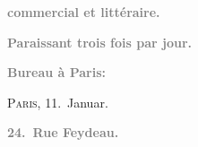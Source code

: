 \pstart
           \begin{otherlanguage}{french}\textcolor{gray}{\textbf{commercial et littéraire.}}\end{otherlanguage}\pend
           
\pstart
           \begin{otherlanguage}{french}\textcolor{gray}{\textbf{\textbf{Paraissant trois fois par jour.}}}\end{otherlanguage}\pend
           
\pstart
           \begin{otherlanguage}{french}\textcolor{gray}{\textbf{\textbf{Bureau à Paris:}}}\end{otherlanguage}\hfill \textsc{Paris}, 11. Januar.\pend
           
\pstart
           \begin{otherlanguage}{french}\textcolor{gray}{\textbf{\textbf{24. Rue Feydeau.}}}\end{otherlanguage}\pend
           
